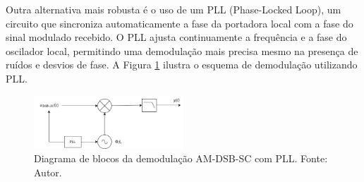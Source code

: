 Outra alternativa mais robusta é o uso de um PLL (Phase-Locked Loop), um circuito que sincroniza automaticamente a fase da portadora local com a fase do sinal modulado recebido. O PLL ajusta continuamente a frequência e a fase do oscilador local, permitindo uma demodulação mais precisa mesmo na presença de ruídos e desvios de fase. A Figura \ref{fig:demodulacao_am_pll} ilustra o esquema de demodulação utilizando PLL.

\begin{figure}[h]
    \centering
    \includegraphics[width=0.5\textwidth]{images/demodulacao_am_pll.png}
    \caption{Diagrama de blocos da demodulação AM-DSB-SC com PLL. Fonte: Autor.}
    \label{fig:demodulacao_am_pll}
    \centering
\end{figure}




